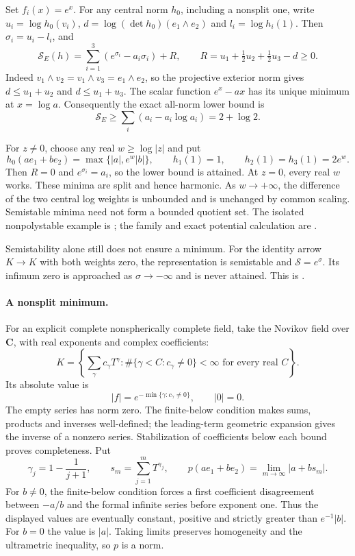 Set $f_i(x)=e^x$. For any central norm $h_0$, including a nonsplit one,
write $u_i=\log h_0(v_i)$, $d=\log(\det h_0)(e_1\wedge e_2)$ and
$l_i=\log h_i(1)$. Then $\sigma_i=u_i-l_i$, and
\[
 \mathscr S_E(h)=\sum_{i=1}^3(e^{\sigma_i}-a_i\sigma_i)+R,
 \qquad R=u_1+\tfrac12u_2+\tfrac12u_3-d\geq0.
\tag{50.90f}\label{eq:ch50-quiver-D4-bound}
\]
Indeed $v_1\wedge v_2=v_1\wedge v_3=e_1\wedge e_2$, so the
projective exterior norm gives $d\leq u_1+u_2$ and $d\leq u_1+u_3$.
The scalar function $e^x-a x$ has its unique minimum at $x=\log a$.
Consequently the exact all-norm lower bound is
\[
 \mathscr S_E\geq\sum_i(a_i-a_i\log a_i)=2+\log2.
\tag{50.90g}\label{eq:ch50-quiver-D4-min}
\]

For $z\ne0$, choose any real $w\geq\log|z|$ and put
\[
 h_0(ae_1+be_2)=\max\{|a|,e^w|b|\},\qquad
 h_1(1)=1,\qquad h_2(1)=h_3(1)=2e^w.
\]
Then $R=0$ and $e^{\sigma_i}=a_i$, so the lower bound is attained.
At $z=0$, every real $w$ works. These minima are split and hence
harmonic. As $w\to+\infty$, the difference of the two central log
weights is unbounded and is unchanged by common scaling. Semistable
minima need not form a bounded quotient set.
The isolated nonpolystable example is
\cite[Example~6.22]{HKKP26CategoricalV1}; the family and exact potential
calculation are \cite[\S6.1]{BB26HarmonicQuiverV1}.

Semistability alone still does not ensure a minimum. For the identity
arrow $K\to K$ with both weights zero, the representation is semistable
and $\mathscr S=e^\sigma$. Its infimum zero is approached as
$\sigma\to-\infty$ and is never attained. This is
\cite[Example~6.21]{HKKP26CategoricalV1}.

\paragraph{A nonsplit minimum.}
For an explicit complete nonspherically complete field, take the Novikov
field over $\mathbf C$, with real exponents and complex coefficients:
\[
 K=\left\{\sum_\gamma c_\gamma T^\gamma:
       \#\{\gamma<C:c_\gamma\ne0\}<\infty
       \text{ for every real }C\right\}.
\]
Its absolute value is
\[
 |f|=e^{-\min\{\gamma:c_\gamma\ne0\}},\qquad |0|=0.
\]
The empty series has norm zero. The finite-below condition makes sums,
products and inverses well-defined; the leading-term geometric expansion
gives the inverse of a nonzero series. Stabilization of coefficients below
each bound proves completeness. Put
\[
 \gamma_j=1-\frac1{j+1},\qquad
 s_m=\sum_{j=1}^m T^{\gamma_j},\qquad
 p(ae_1+be_2)=\lim_{m\to\infty}|a+bs_m|.
\tag{50.90h}\label{eq:ch50-quiver-nonsplit-norm}
\]
For $b\ne0$, the finite-below condition forces a first coefficient
disagreement between $-a/b$ and the formal infinite series before
exponent one. Thus the displayed values are eventually constant,
positive and strictly greater than $e^{-1}|b|$. For $b=0$ the value
is $|a|$. Taking limits preserves homogeneity and the ultrametric
inequality, so $p$ is a norm.

